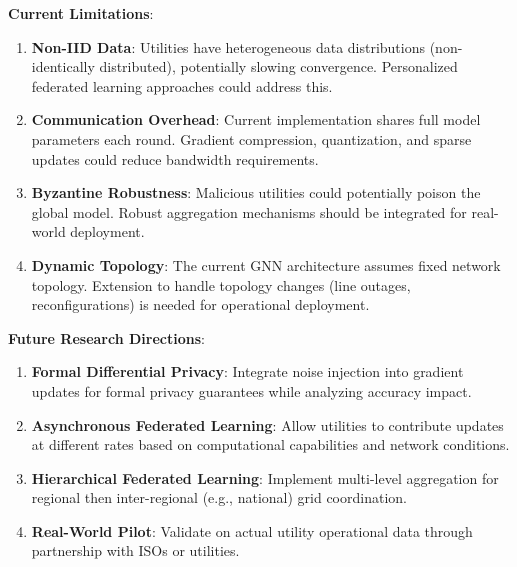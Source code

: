 \documentclass[journal,10pt]{IEEEtran}
\begin{document}
\textbf{Current Limitations}:
\begin{enumerate}
    \item \textbf{Non-IID Data}: Utilities have heterogeneous data distributions (non-identically distributed), potentially slowing convergence. Personalized federated learning approaches \cite{fallah2020personalized} could address this.
    
    \item \textbf{Communication Overhead}: Current implementation shares full model parameters each round. Gradient compression, quantization, and sparse updates \cite{konecny2016federated} could reduce bandwidth requirements.
    
    \item \textbf{Byzantine Robustness}: Malicious utilities could potentially poison the global model. Robust aggregation mechanisms \cite{elmhamdi2018hidden} should be integrated for real-world deployment.
    
    \item \textbf{Dynamic Topology}: The current GNN architecture assumes fixed network topology. Extension to handle topology changes (line outages, reconfigurations) is needed for operational deployment.
\end{enumerate}

\textbf{Future Research Directions}:
\begin{enumerate}
    \item \textbf{Formal Differential Privacy}: Integrate noise injection into gradient updates for formal privacy guarantees while analyzing accuracy impact.
    
    \item \textbf{Asynchronous Federated Learning}: Allow utilities to contribute updates at different rates based on computational capabilities and network conditions.
    
    \item \textbf{Hierarchical Federated Learning}: Implement multi-level aggregation for regional then inter-regional (e.g., national) grid coordination.
    
    \item \textbf{Real-World Pilot}: Validate on actual utility operational data through partnership with ISOs or utilities.
\end{enumerate}

\end{document}
